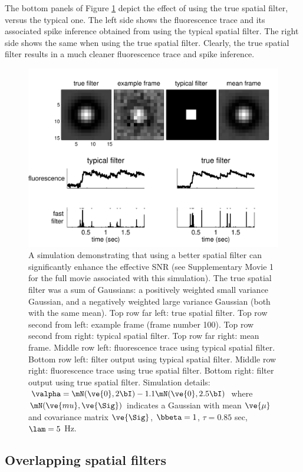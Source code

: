 The bottom panels of Figure \ref{fig:spatial} depict the effect of using the true spatial filter, versus the typical one. The left side shows the fluorescence trace and its associated spike inference obtained from using the typical spatial filter.  The right side shows the same when using the true spatial filter.  Clearly, the true spatial filter results in a much cleaner fluorescence trace and spike inference.  


\begin{figure}[h!]
\centering \includegraphics[width=.9\linewidth]{../figs/spatial2}
\caption{A simulation demonstrating that using a better spatial filter can significantly enhance the effective SNR (see Supplementary Movie 1 for the full movie associated with this simulation). The true spatial filter was a sum of Gaussians: a positively weighted small variance Gaussian, and a negatively weighted large variance Gaussian (both with the same mean).  Top row far left: true spatial filter.  Top row second from left: example frame (frame number 100). Top row second from right: typical spatial filter.   Top row far right: mean frame.  Middle row left: fluorescence trace using typical spatial filter. Bottom row left: \foopsi filter output using typical spatial filter.  Middle row right: fluorescence trace using true spatial filter.  Bottom right: \foopsi filter output using true spatial filter. Simulation details: $\valpha=\mN(\ve{0},2 \bI)-1.1 \mN(\ve{0},2.5 \bI)$ where $\mN(\ve{mu},\ve{\Sig})$ indicates a Gaussian with mean $\ve{\mu}$ and covariance matrix $\ve{\Sig}$, $\bbeta=1$, $\tau=0.85$ sec, $\lam=5$ Hz.} \label{fig:spatial} 
\end{figure}



\subsection{Overlapping spatial filters}


